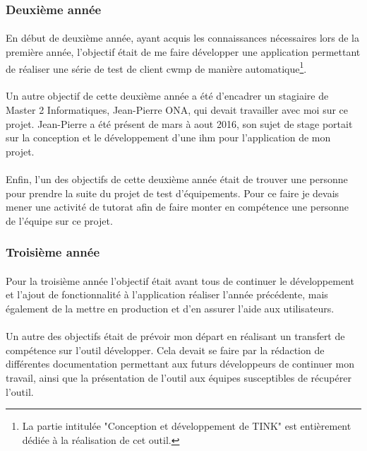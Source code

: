 \documentclass[12pt,a4paper]{report}
\begin{document}
\subsubsection{Deuxième année}
\paragraph*{}En début de deuxième année, ayant acquis les connaissances nécessaires lors de la première année, l'objectif était de me faire développer une application permettant de réaliser une série de test de client \gls{cwmp} de manière automatique\footnote{La partie intitulée "Conception et développement de TINK" est entièrement dédiée à la réalisation de cet outil.}.
\paragraph*{}Un autre objectif de cette deuxième année a été d'encadrer un stagiaire de Master 2 Informatiques, Jean-Pierre ONA, qui devait travailler avec moi sur ce projet. Jean-Pierre a été présent de mars à aout 2016, son sujet de stage portait sur la conception et le développement d'une \gls{ihm} pour l'application de mon projet.
\paragraph*{}Enfin, l'un des objectifs de cette deuxième année était de trouver une personne pour prendre la suite du projet de test d'équipements. Pour ce faire je devais mener une activité de tutorat afin de faire monter en compétence une personne de l'équipe sur ce projet.\\
\subsubsection{Troisième année}
\paragraph*{}Pour la troisième année l'objectif était avant tous de continuer le développement et l'ajout de fonctionnalité à l'application réaliser l'année précédente, mais également de la mettre en production et d'en assurer l'aide aux utilisateurs. 
\paragraph*{}Un autre des objectifs était de prévoir mon départ en réalisant un transfert de compétence sur l'outil développer. Cela devait se faire par la rédaction de différentes documentation permettant aux futurs développeurs de continuer mon travail, ainsi que la présentation de l'outil aux équipes susceptibles de récupérer l'outil.\\
\end{document}
